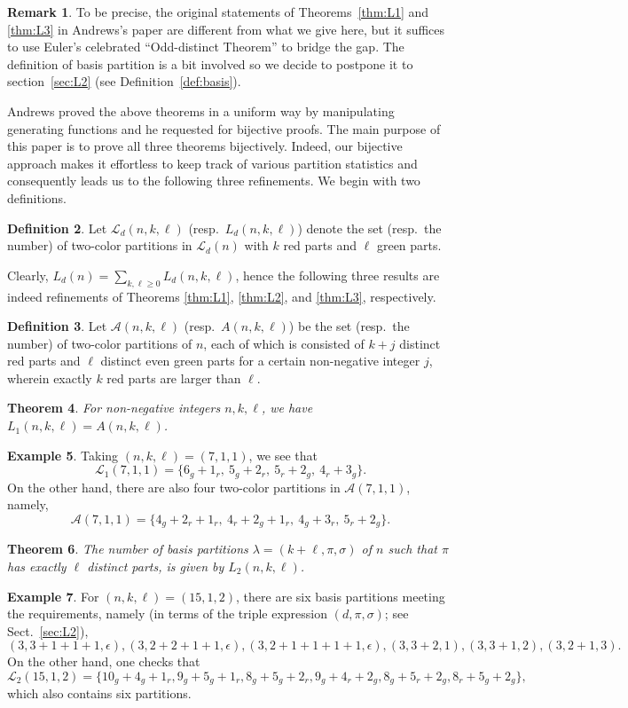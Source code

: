 \documentclass[11pt,reqno]{amsart}
\numberwithin{equation}{section}
\theoremstyle{plain}
\newtheorem{theorem}{Theorem}[section]
\theoremstyle{definition}
\newtheorem{Def}[theorem]{Definition}
\newtheorem{example}[theorem]{Example}
\newtheorem{remark}[theorem]{Remark}
\newcommand{\A}{\mathcal{A}}
\renewcommand{\L}{\mathcal{L}}
\begin{document}
\begin{remark}
To be precise, the original statements of Theorems~\ref{thm:L1} and \ref{thm:L3} in Andrews's paper \cite{and21} are different from what we give here, but it suffices to use Euler's celebrated ``Odd-distinct Theorem'' to bridge the gap. The definition of basis partition is a bit involved so we decide to postpone it to section~\ref{sec:L2} (see Definition~\ref{def:basis}).
\end{remark}

Andrews \cite{and21} proved the above theorems in a uniform way by manipulating generating functions and he requested for bijective proofs. The main purpose of this paper is to prove all three theorems bijectively. Indeed, our bijective approach makes it effortless to keep track of various partition statistics and consequently leads us to the following three refinements. We begin with two definitions.

\begin{Def}
Let $\L_d(n,k,\ell)$ (resp.~$L_d(n,k,\ell)$) denote the set (resp.~the number) of two-color partitions in $\L_d(n)$ with $k$ red parts and $\ell$ green parts. 
\end{Def}
Clearly, $L_d(n)=\sum_{k,\ell\ge 0}L_d(n,k,\ell)$, hence the following three results are indeed refinements of Theorems \ref{thm:L1}, \ref{thm:L2}, and \ref{thm:L3}, respectively.

\begin{Def}\label{def:A}
Let $\A(n,k,\ell)$ (resp.~$A(n,k,\ell)$) be the set (resp.~the number) of two-color partitions of $n$, each of which is consisted of $k+j$ distinct red parts and $\ell$ distinct even green parts for a certain non-negative integer $j$, wherein exactly $k$ red parts are larger than $\ell$.
\end{Def}

\begin{theorem}\label{thm:L1-ref}
For non-negative integers $n,k,\ell$, we have
$L_1(n,k,\ell)=A(n,k,\ell)$.
\end{theorem}
\begin{example}
Taking $(n,k,\ell)=(7,1,1)$, we see that $$\L_1(7,1,1)=\{6_g+1_r,~5_g+2_r,~5_r+2_g,~4_r+3_g\}.$$ On the other hand, there are also four two-color partitions in $\A(7,1,1)$, namely,
$$\A(7,1,1)=\{4_g+2_r+1_r,~4_r+2_g+1_r,~4_g+3_r,~5_r+2_g\}.$$
\end{example}

\begin{theorem}\label{thm:L2-ref}
The number of basis partitions $\lambda=(k+\ell,\pi,\sigma)$ of $n$ such that $\pi$ has exactly $\ell$ distinct parts, is given by $L_2(n,k,\ell)$.
\end{theorem}
\begin{example}
For $(n,k,\ell)=(15,1,2)$, there are six basis partitions meeting the requirements, namely (in terms of the triple expression $(d,\pi,\sigma)$; see Sect.~\ref{sec:L2}),
$$(3,3+1+1+1,\epsilon), (3,2+2+1+1,\epsilon), (3,2+1+1+1+1,\epsilon), (3,3+2,1), (3,3+1,2), (3,2+1,3).$$
On the other hand, one checks that
$$\L_2(15,1,2)=\{10_g+4_g+1_r,9_g+5_g+1_r,8_g+5_g+2_r,9_g+4_r+2_g,8_g+5_r+2_g,8_r+5_g+2_g\},$$
which also contains six partitions.
\end{example}
\end{document}
